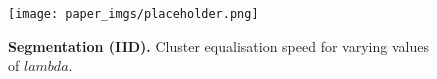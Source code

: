 \begin{figure}[h]
\centering
\texttt{[image: paper\_imgs/placeholder.png]}
\caption{\textbf{Segmentation (IID).} Cluster equalisation speed for varying values of $lambda$.}
\end{figure}